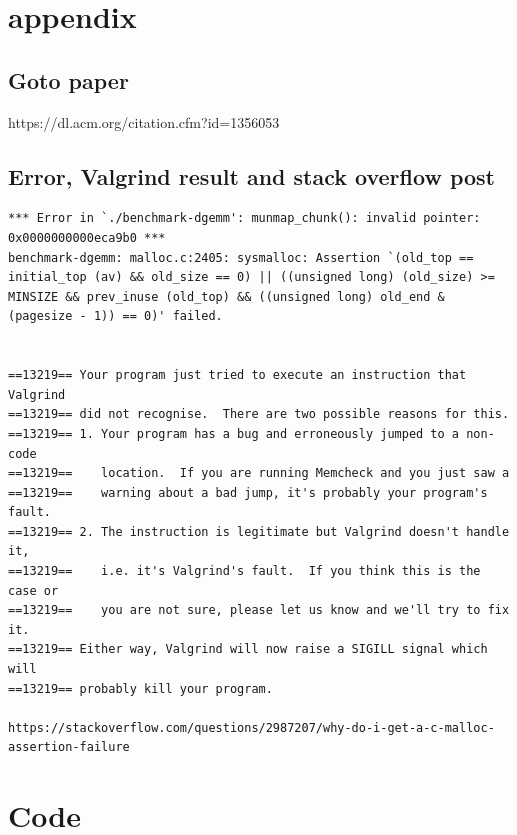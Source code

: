\documentclass[a4paper,10pt,titlepage]{report}
\begin{document}
\newpage
\section{appendix}
\subsection{Goto paper }
https://dl.acm.org/citation.cfm?id=1356053 \\
\subsection{Error, Valgrind result and stack overflow post }

\begin{lstlisting}
*** Error in `./benchmark-dgemm': munmap_chunk(): invalid pointer: 0x0000000000eca9b0 ***
benchmark-dgemm: malloc.c:2405: sysmalloc: Assertion `(old_top == initial_top (av) && old_size == 0) || ((unsigned long) (old_size) >= MINSIZE && prev_inuse (old_top) && ((unsigned long) old_end & (pagesize - 1)) == 0)' failed.


==13219== Your program just tried to execute an instruction that Valgrind
==13219== did not recognise.  There are two possible reasons for this.
==13219== 1. Your program has a bug and erroneously jumped to a non-code
==13219==    location.  If you are running Memcheck and you just saw a
==13219==    warning about a bad jump, it's probably your program's fault.
==13219== 2. The instruction is legitimate but Valgrind doesn't handle it,
==13219==    i.e. it's Valgrind's fault.  If you think this is the case or
==13219==    you are not sure, please let us know and we'll try to fix it.
==13219== Either way, Valgrind will now raise a SIGILL signal which will
==13219== probably kill your program.

https://stackoverflow.com/questions/2987207/why-do-i-get-a-c-malloc-assertion-failure
\end{lstlisting}


\section{Code}



%
\end{document}
